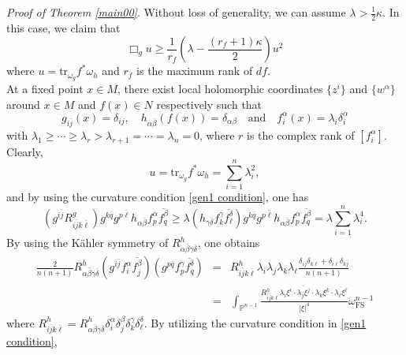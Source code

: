 \documentclass[12pt]{amsart}
\theoremstyle{plain}
\theoremstyle{definition}
\renewcommand{\bar}{\overline}
\newcommand{\beq}{\begin{equation}}
\newcommand{\eeq}{\end{equation}}
\newcommand{\ee}{\end{eqnarray*}}
\newcommand{\be}{\begin{eqnarray*}}
\newcommand{\qtq}[1]{\quad\mbox{#1}\quad}
\renewcommand{\>}{\rightarrow}
\renewcommand{\P}{{\mathbb P}}
\newcommand{\om}{\omega}
\numberwithin{equation}{section} %
\begin{document}
\baselineskip



\noindent\emph{Proof of Theorem \ref{main00}}.
    Without loss of generality, we can assume $
\lambda>\frac{1}{2}\kappa$.
In this case, we claim that \beq \Box_g u \geq \frac{1}{r_f}\left(\lambda-  \frac{(r_f+1)\kappa}{2}\right)u^2\label{gen1 maximum}\eeq
where $u=\mbox{tr}_{\omega_g} f^*\omega_h$ and $r_f$ is the maximum rank of $df$. \\


At a fixed point $x\in M$, there exist local holomorphic coordinates $\{z^i\}$ and $\{w^\alpha\}$ around $x\in M$ and $f(x)\in N$ respectively such that
\[
g_{i\bar j}(x)=\delta_{ij},\quad
h_{\alpha\bar\beta}(f(x))=\delta_{\alpha\beta}
\qtq{and} f_i^\alpha(x)=\lambda_i\delta_i^\alpha
\]
with $\lambda_1\ge\cdots\ge\lambda_r>\lambda_{r+1}=\cdots=\lambda_n=0$, where $r$ is the complex rank of $\left[f_i^\alpha\right]$.
Clearly, $$u=\mbox{tr}_{\omega_g} f^*\omega_h=\sum_{i=1}^n\lambda_i^2,$$ and by using the curvature condition \eqref{gen1 condition},  one has
\beq
\left(g^{i\bar j} R^g_{i\bar j k\bar \ell} \right)g^{k\bar q} g^{p\bar \ell} h_{\alpha\bar\beta} f^{\alpha }_p \bar{f^\beta_q}
\ge  \lambda \left(h_{\gamma\bar \delta} f_k^\gamma \bar{f_\ell^\delta} \right) g^{k\bar q} g^{p\bar \ell} h_{\alpha\bar\beta} f^{\alpha }_p \bar{f^\beta_q}
=\lambda\sum_{i=1}^n\lambda_i^4. \label{gen1 inequality1}
\eeq
\noindent
By using the K\"ahler symmetry of $R^h_{\alpha\bar\beta\gamma\bar\delta}$, one obtains
\be
\frac{2}{n(n+1)} R^h_{\alpha\bar\beta\gamma\bar\delta}\left(g^{i\bar j} f^{\alpha}_i \bar{f^{\beta}_j} \right)  \left(g^{p\bar q}  f^\gamma_p \bar{f^\delta_q} \right)
&=&  R^h_{i\bar jk\bar\ell} \lambda_i\lambda_j\lambda_k\lambda_\ell
\frac{\delta_{ij}\delta_{k\ell}+ \delta_{i\ell}\delta_{kj} }{n(n+1)}\\
&=&  \int_{\P^{n-1}}\frac{
    R^h_{i\bar jk\bar\ell} \lambda_i\xi^i\cdot \bar{\lambda_j\xi^j}\cdot\lambda_k\xi^k\cdot \bar{\lambda_\ell\xi^\ell}
}{|\xi|^4}\om_{\mathrm{FS}}^{n-1}
\ee
where $R^h_{i\bar jk\bar\ell}=R^h_{\alpha\bar\beta\gamma\bar\delta}\delta_i^\alpha\delta_j^\beta\delta_k^\gamma\delta_{\ell}^\delta$.  By utilizing the curvature condition in \eqref{gen1 condition},
\end{document}
